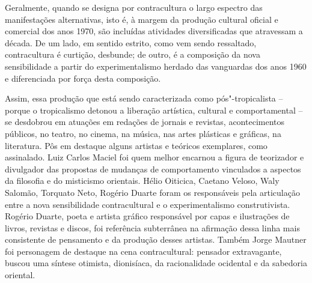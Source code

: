 Geralmente, quando se designa por contracultura o largo espectro das
manifestações alternativas, isto é, à margem da produção cultural
oficial e comercial dos anos 1970, são incluídas atividades
diversificadas que atravessam a década. De um lado, em sentido estrito,
como vem sendo ressaltado, contracultura é curtição, desbunde; de outro,
é a composição da nova sensibilidade a partir do experimentalismo
herdado das vanguardas dos anos 1960 e diferenciada por força desta
composição.

Assim, essa produção que está sendo caracterizada como pós"-tropicalista
-- porque o tropicalismo detonou a liberação artística, cultural e
comportamental -- se desdobrou em atuações em redações de jornais e
revistas, acontecimentos públicos, no teatro, no cinema, na música, nas
artes plásticas e gráficas, na literatura. Pôs em destaque alguns
artistas e teóricos exemplares, como assinalado. Luiz Carlos Maciel foi
quem melhor encarnou a figura de teorizador e divulgador das propostas
de mudanças de comportamento vinculados a aspectos da filosofia e do
misticismo orientais. Hélio Oiticica, Caetano Veloso, Waly Salomão,
Torquato Neto, Rogério Duarte foram os responsáveis pela articulação
entre a nova sensibilidade contracultural e o experimentalismo
construtivista. Rogério Duarte, poeta e artista gráfico responsável por
capas e ilustrações de livros, revistas e discos, foi referência
subterrânea na afirmação dessa linha mais consistente de pensamento e da
produção desses artistas. Também Jorge Mautner foi personagem de
destaque na cena contracultural: pensador extravagante, buscou uma
síntese otimista, dionisíaca, da racionalidade ocidental e da sabedoria
oriental.

